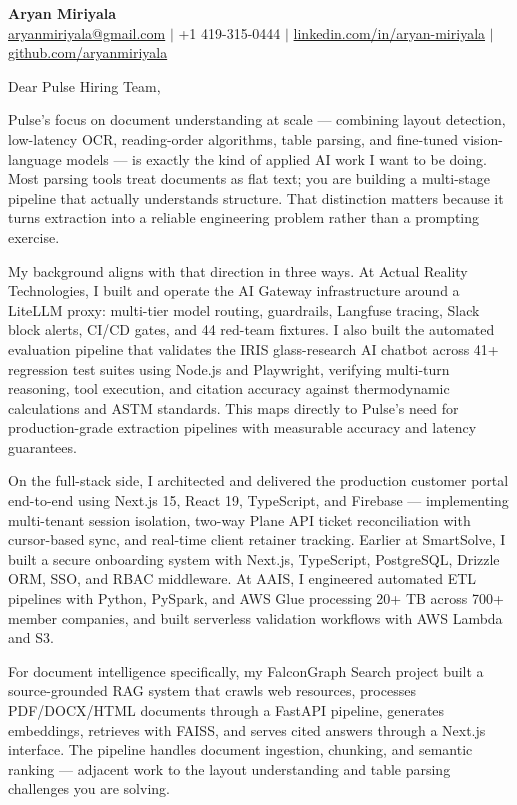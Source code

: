 \documentclass[11pt]{letter}
\begin{document}
\begin{center}
{\Large \textbf{Aryan Miriyala}}\\
\href{mailto:aryanmiriyala@gmail.com}{aryanmiriyala@gmail.com} $|$ +1 419-315-0444 $|$
\href{https://www.linkedin.com/in/aryan-miriyala-7788a21b6/}{linkedin.com/in/aryan-miriyala} $|$
\href{https://github.com/aryanmiriyala}{github.com/aryanmiriyala}
\end{center}

\vspace{0.15in}

Dear Pulse Hiring Team,

Pulse's focus on document understanding at scale — combining layout detection, low-latency OCR, reading-order algorithms, table parsing, and fine-tuned vision-language models — is exactly the kind of applied AI work I want to be doing. Most parsing tools treat documents as flat text; you are building a multi-stage pipeline that actually understands structure. That distinction matters because it turns extraction into a reliable engineering problem rather than a prompting exercise.

My background aligns with that direction in three ways. At Actual Reality Technologies, I built and operate the AI Gateway infrastructure around a LiteLLM proxy: multi-tier model routing, guardrails, Langfuse tracing, Slack block alerts, CI/CD gates, and 44 red-team fixtures. I also built the automated evaluation pipeline that validates the IRIS glass-research AI chatbot across 41+ regression test suites using Node.js and Playwright, verifying multi-turn reasoning, tool execution, and citation accuracy against thermodynamic calculations and ASTM standards. This maps directly to Pulse's need for production-grade extraction pipelines with measurable accuracy and latency guarantees.

On the full-stack side, I architected and delivered the production customer portal end-to-end using Next.js 15, React 19, TypeScript, and Firebase — implementing multi-tenant session isolation, two-way Plane API ticket reconciliation with cursor-based sync, and real-time client retainer tracking. Earlier at SmartSolve, I built a secure onboarding system with Next.js, TypeScript, PostgreSQL, Drizzle ORM, SSO, and RBAC middleware. At AAIS, I engineered automated ETL pipelines with Python, PySpark, and AWS Glue processing 20+ TB across 700+ member companies, and built serverless validation workflows with AWS Lambda and S3.

For document intelligence specifically, my FalconGraph Search project built a source-grounded RAG system that crawls web resources, processes PDF/DOCX/HTML documents through a FastAPI pipeline, generates embeddings, retrieves with FAISS, and serves cited answers through a Next.js interface. The pipeline handles document ingestion, chunking, and semantic ranking — adjacent work to the layout understanding and table parsing challenges you are solving.
\end{document}
